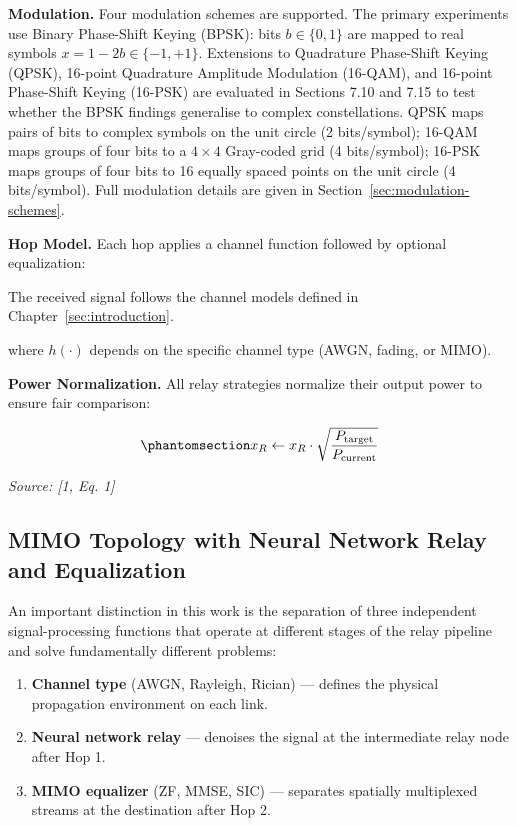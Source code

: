 \textbf{Modulation.} Four modulation schemes are supported. The primary experiments use Binary Phase-Shift Keying (BPSK): bits \(b \in \{0, 1\}\) are mapped to real symbols \(x = 1 - 2b \in \{-1, +1\}\). Extensions to Quadrature Phase-Shift Keying (QPSK), 16-point Quadrature Amplitude Modulation (16-QAM), and 16-point Phase-Shift Keying (16-PSK) are evaluated in Sections 7.10 and 7.15 to test whether the BPSK findings generalise to complex constellations. QPSK maps pairs of bits to complex symbols on the unit circle (2 bits/symbol); 16-QAM maps groups of four bits to a \(4 \times 4\) Gray-coded grid (4 bits/symbol); 16-PSK maps groups of four bits to 16 equally spaced points on the unit circle (4 bits/symbol). Full modulation details are given in Section~\ref{sec:modulation-schemes}.

\textbf{Hop Model.} Each hop applies a channel function followed by optional equalization:

The received signal follows the channel models defined in Chapter~\ref{sec:introduction}.

where \(h(\cdot)\) depends on the specific channel type (AWGN, fading, or MIMO).

\textbf{Power Normalization.} All relay strategies normalize their output power to ensure fair comparison:

\begin{equation}\protect\phantomsection\label{eq:power-normalization}{x_R \leftarrow x_R \cdot \sqrt{\frac{P_{\text{target}}}{P_{\text{current}}}}
}\end{equation} \par{\small\textit{Source: [1, Eq. 1]}}

\subsection{MIMO Topology with Neural Network Relay and Equalization}\label{sec:mimo-topology-with-neural-network-relay-and-equalization}

An important distinction in this work is the separation of three independent signal-processing functions that operate at different stages of the relay pipeline and solve fundamentally different problems:

\begin{enumerate}
\def\labelenumi{\arabic{enumi}.}
\tightlist
\item
  \textbf{Channel type} (AWGN, Rayleigh, Rician) --- defines the physical propagation environment on each link.
\item
  \textbf{Neural network relay} --- denoises the signal at the intermediate relay node after Hop 1.
\item
  \textbf{MIMO equalizer} (ZF, MMSE, SIC) --- separates spatially multiplexed streams at the destination after Hop 2.
\end{enumerate}

